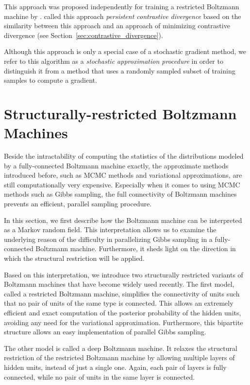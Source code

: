 \documentclass{now}
\begin{document}
This approach was proposed independently for
training a restricted Boltzmann machine by
\citet{Tieleman2008}.  \citet{Tieleman2008} called this
approach \textit{persistent contrastive divergence} based on
the similarity between this approach and an approach of
minimizing contrastive divergence (see
Section~\ref{sec:contrastive_divergence}).

Although this approach is only a special case of a
stochastic gradient method, we refer to this algorithm as a
\textit{stochastic approximation procedure} in order to
distinguish it from a method that uses a randomly sampled
subset of training samples to compute a gradient.



\section{Structurally-restricted Boltzmann Machines}
\label{sec:srbm}

Beside the intractability of computing the statistics of the
distributions modeled by a fully-connected Boltzmann machine
exactly, the approximate methods introduced before, such as
MCMC methods and variational approximations, are still
computationally very expensive. Especially when it comes to
using MCMC methods such as Gibbs sampling, the full
connectivity of Boltzmann machines prevents an efficient,
parallel sampling procedure.

In this section, we first describe how the Boltzmann machine
can be interpreted as a Markov random field. This
interpretation allows us to examine the underlying reason of
the difficulty in parallelizing Gibbs sampling in a
fully-connected Boltzmann machine. Furthermore, it sheds
light on the
direction in which the structural restriction will be applied.

Based on this interpretation, we introduce two structurally
restricted variants of Boltzmann machines that have become
widely used recently. The first model, called a restricted
Boltzmann machine, simplifies the connectivity of units such
that no pair of units of the same type is connected. This
allows an extremely efficient and exact computation of the
posterior probability of the hidden units, avoiding any need
for the variational approximation. Furthermore, this
bipartite structure allows an easy implementation of
parallel Gibbs sampling.

The other model is called a deep Boltzmann machine. It
relaxes the structural restriction of the restricted
Boltzmann machine by allowing multiple layers of hidden
units, instead of just a single one. Again, each pair of
layers is fully connected, while no pair of units in the
same layer is connected.
\end{document}
